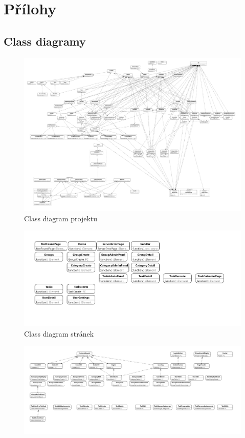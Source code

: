 \documentclass[a4paper,12pt]{report}
\begin{document}
\chapter{Přílohy}
\begin{landscape}
\section{Class diagramy}

\begin{figure}[hbt!]
	\includegraphics[width=1\linewidth, height=0.55\linewidth]{img/ClassDiagramy/src_diagram_export.png}
	\caption{Class diagram projektu}
	\label{fig:enter-label}
\end{figure}
\pagebreak
\begin{figure}[hbt!]
	\centering
	\includegraphics[width=1\linewidth]{img/ClassDiagramy/pages_diagram.png}
	\caption{Class diagram stránek}
\end{figure}
\begin{figure}[hbt!]
	\centering
	\includegraphics[width=1\linewidth]{img/ClassDiagramy/components_diagram.png}

\end{figure}
\end{landscape}
\end{document}

